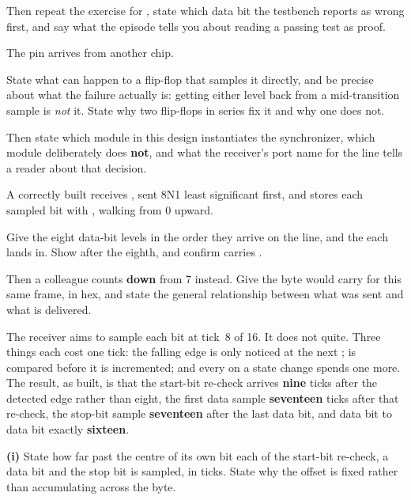 Then repeat the exercise for , state which data bit the testbench reports as wrong first,
and say what the episode tells you about reading a passing test as proof. 

\label{exa:q:3}

 The  pin arrives from another chip.

State what can happen to a flip-flop that samples it directly, and be precise about what the failure
actually is: getting either level back from a mid-transition sample is \emph{not} it. State why two
flip-flops in series fix it and why one does not.

Then state which module in this design instantiates the synchronizer, which module deliberately
does \textbf{not}, and what the receiver's port name for the line tells a reader about that
decision. 

 A correctly built  receives , sent 8N1 least significant first,
and stores each sampled bit with , walking  from 0
upward.

Give the eight data-bit levels in the order they arrive on the line, and the  each
lands in. Show  after the eighth, and confirm  carries .

Then a colleague counts  \textbf{down} from 7 instead. Give the byte 
would carry for this same frame, in hex, and state the general relationship between what was sent
and what is delivered. 

 The receiver aims to sample each bit at tick~8 of 16. It does not quite. Three things
each cost one tick: the falling edge is only noticed at the next ;  is
compared before it is incremented; and every  on a state change spends one more.
The result, as built, is that the start-bit re-check arrives \textbf{nine} ticks after the detected
edge rather than eight, the first data sample \textbf{seventeen} ticks after that re-check, the
stop-bit sample \textbf{seventeen} after the last data bit, and data bit to data bit exactly
\textbf{sixteen}.

\medskip\noindent\textbf{(i)} State how far past the centre of its own bit each of the start-bit
re-check, a data bit and the stop bit is sampled, in ticks. State why the offset is fixed rather
than accumulating across the byte. 


